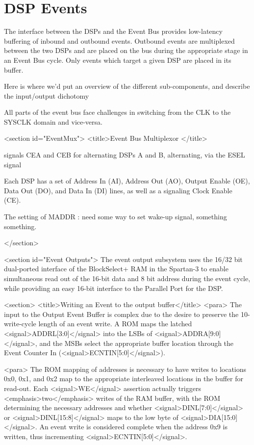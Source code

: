 \section{DSP Events}

The interface between the DSPs and the Event Bus provides low-latency
buffering of inbound and outbound events. Outbound events are
multiplexed between the two DSPs and are placed on the bus during the
appropriate stage in an Event Bus cycle. Only events which target a
given DSP are placed in its buffer.

Here is where we'd put an overview of the different sub-components,
and describe the input/output dichotomy

All parts of the event bus face challenges in switching from the CLK
to the SYSCLK domain and vice-versa.

    <section  id="EventMux">
      <title>Event Bus Multiplexor </title>
      
      signals CEA and CEB for alternating DSPs A and B, alternating, via the ESEL signal
      
      Each DSP has a set of Address In (AI), Address Out (AO), Output Enable (OE), Data Out (DO), and Data In (DI) lines, as well as a signaling Clock Enable (CE). 

      The setting of MADDR : need some way to set wake-up signal, something something. 

      

    </section>
    
    <section id="Event Outputs">
       The event output subsystem uses the 16/32 bit dual-ported
      interface of the BlockSelect+ RAM in the Spartan-3 to enable
      simultaneous read out of the 16-bit data and 8 bit address
      during the event cycle, while providing an easy 16-bit interface
      to the Parallel Port for the DSP. 

      <section>
        <title>Writing an Event to the output buffer</title>
        <para> The input to the Output Event Buffer is complex due to
        the desire to preserve the 10-write-cycle length of an event
        write. A ROM maps the latched <signal>ADDRL[3:0]</signal> into
        the LSBs of <signal>ADDRA[9:0]</signal>, and the MSBs select the
        appropriate buffer location through the Event Counter In
        (<signal>ECNTIN[5:0]</signal>). 
        
        <para> The ROM mapping of addresses is necessary to have writes
        to locations 0x0, 0x1, and 0x2 map to the appropriate
        interleaved locations in the buffer for read-out.  Each
        <signal>WE</signal> assertion actually triggers
        <emphasis>two</emphasis> writes of the RAM buffer, with the ROM
        determining the necessary addresses and whether
        <signal>DINL[7:0]</signal> or <signal>DINL[15:8]</signal> maps
        to the low byte of <signal>DIA[15:0]</signal>. An event write is
        considered complete when the address 0x9 is written, thus
        incrementing <signal>ECNTIN[5:0]</signal>.
        
